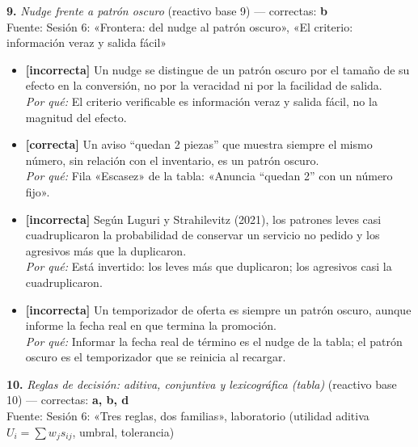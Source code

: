 \documentclass[10pt,letterpaper]{article}
\begin{document}
\vspace{3pt}\noindent\textbf{9.} \textit{Nudge frente a patrón oscuro} (reactivo base 9) — correctas: \textbf{b}\\[-1pt]
{\scriptsize Fuente: Sesión 6: «Frontera: del nudge al patrón oscuro», «El criterio: información veraz y salida fácil»}
\begin{itemize}[leftmargin=1.2em,itemsep=0pt,topsep=1pt,parsep=0pt]
\item[\textbf{a)}] {\footnotesize \textbf{[incorrecta]} Un nudge se distingue de un patrón oscuro por el tamaño de su efecto en la conversión, no por la veracidad ni por la facilidad de salida.\\ \textit{Por qué:} El criterio verificable es información veraz y salida fácil, no la magnitud del efecto.}
\item[\textbf{b)}] {\footnotesize \textbf{[correcta]} Un aviso \enquote{quedan 2 piezas} que muestra siempre el mismo número, sin relación con el inventario, es un patrón oscuro.\\ \textit{Por qué:} Fila «Escasez» de la tabla: «Anuncia \enquote{quedan 2} con un número fijo».}
\item[\textbf{c)}] {\footnotesize \textbf{[incorrecta]} Según Luguri y Strahilevitz (2021), los patrones leves casi cuadruplicaron la probabilidad de conservar un servicio no pedido y los agresivos más que la duplicaron.\\ \textit{Por qué:} Está invertido: los leves más que duplicaron; los agresivos casi la cuadruplicaron.}
\item[\textbf{d)}] {\footnotesize \textbf{[incorrecta]} Un temporizador de oferta es siempre un patrón oscuro, aunque informe la fecha real en que termina la promoción.\\ \textit{Por qué:} Informar la fecha real de término es el nudge de la tabla; el patrón oscuro es el temporizador que se reinicia al recargar.}
\end{itemize}
\vspace{3pt}\noindent\textbf{10.} \textit{Reglas de decisión: aditiva, conjuntiva y lexicográfica (tabla)} (reactivo base 10) — correctas: \textbf{a, b, d}\\[-1pt]
{\scriptsize Fuente: Sesión 6: «Tres reglas, dos familias», laboratorio (utilidad aditiva $U_i=\sum w_j s_{ij}$, umbral, tolerancia)}
\end{document}
